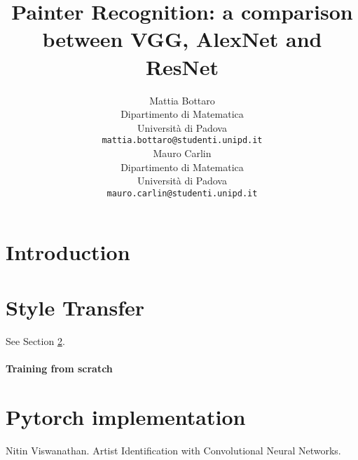 \documentclass{article}
\title{Painter Recognition: a comparison between VGG, AlexNet and ResNet}
\author{
  Mattia Bottaro \\
  Dipartimento  di Matematica\\
  Università di Padova \\
  \texttt{mattia.bottaro@studenti.unipd.it} \\
   \And
  Mauro Carlin \\
Dipartimento  di Matematica\\
Università di Padova \\
\texttt{mauro.carlin@studenti.unipd.it} \\
}
\begin{document}
\maketitle

\begin{abstract}
\lipsum[1]
\end{abstract}




\section{Introduction}
\lipsum[2]
\lipsum[3]


\section{Style Transfer}
\label{sec:headings}

\lipsum[4] See Section \ref{sec:headings}.

\paragraph{Training from scratch}
\lipsum[7]

\section{Pytorch implementation}
\label{sec:others}

\begin{thebibliography}{1}
	
	Nitin Viswanathan.
	\newblock Artist Identification with Convolutional Neural Networks. 
	
\end{thebibliography}
\end{document}
